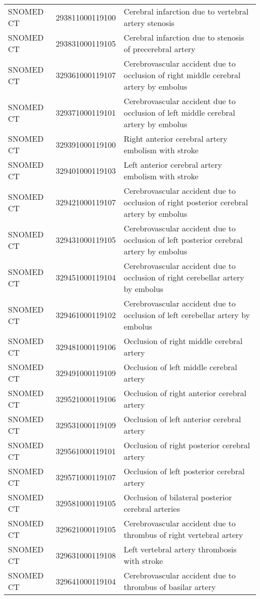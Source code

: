 \begin{longtable}{p{}p{}p{}}
  SNOMED CT & 293811000119100 & Cerebral infarction due to vertebral artery stenosis \\ 
  SNOMED CT & 293831000119105 & Cerebral infarction due to stenosis of precerebral artery \\ 
  SNOMED CT & 329361000119107 & Cerebrovascular accident due to occlusion of right middle cerebral artery by embolus \\ 
  SNOMED CT & 329371000119101 & Cerebrovascular accident due to occlusion of left middle cerebral artery by embolus \\ 
  SNOMED CT & 329391000119100 & Right anterior cerebral artery embolism with stroke \\ 
  SNOMED CT & 329401000119103 & Left anterior cerebral artery embolism with stroke \\ 
  SNOMED CT & 329421000119107 & Cerebrovascular accident due to occlusion of right posterior cerebral artery by embolus \\ 
  SNOMED CT & 329431000119105 & Cerebrovascular accident due to occlusion of left posterior cerebral artery by embolus \\ 
  SNOMED CT & 329451000119104 & Cerebrovascular accident due to occlusion of right cerebellar artery by embolus \\ 
  SNOMED CT & 329461000119102 & Cerebrovascular accident due to occlusion of left cerebellar artery by embolus \\ 
  SNOMED CT & 329481000119106 & Occlusion of right middle cerebral artery \\ 
  SNOMED CT & 329491000119109 & Occlusion of left middle cerebral artery \\ 
  SNOMED CT & 329521000119106 & Occlusion of right anterior cerebral artery \\ 
  SNOMED CT & 329531000119109 & Occlusion of left anterior cerebral artery \\ 
  SNOMED CT & 329561000119101 & Occlusion of right posterior cerebral artery \\ 
  SNOMED CT & 329571000119107 & Occlusion of left posterior cerebral artery \\ 
  SNOMED CT & 329581000119105 & Occlusion of bilateral posterior cerebral arteries \\ 
  SNOMED CT & 329621000119105 & Cerebrovascular accident due to thrombus of right vertebral artery \\ 
  SNOMED CT & 329631000119108 & Left vertebral artery thrombosis with stroke \\ 
  SNOMED CT & 329641000119104 & Cerebrovascular accident due to thrombus of basilar artery \\ 

\end{longtable}
